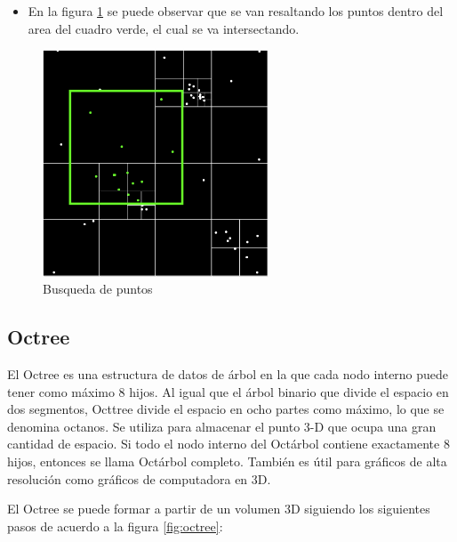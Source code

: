 \documentclass{article}
\begin{document}
\begin{itemize}
\item En la figura \ref{fig:quadtree_search} se puede observar que se van resaltando los puntos dentro del area del cuadro verde, el cual se va intersectando.
\end{itemize}

\begin{figure}[h!]
\centering
\includegraphics[width=0.6\textwidth]{img/quadtree_search.png}
\caption{Busqueda de puntos}
\label{fig:quadtree_search}
\end{figure}
\clearpage
\subsection{Octree}

 El Octree es una estructura de datos de árbol en la que cada nodo interno puede tener como máximo 8 hijos. Al igual que el árbol binario que divide el espacio en dos segmentos, Octtree divide el espacio en ocho partes como máximo, lo que se denomina octanos. Se utiliza para almacenar el punto 3-D que ocupa una gran cantidad de espacio. Si todo el nodo interno del Octárbol contiene exactamente 8 hijos, entonces se llama Octárbol completo. También es útil para gráficos de alta resolución como gráficos de computadora en 3D.
           
El Octree se puede formar a partir de un volumen 3D siguiendo los siguientes pasos de acuerdo a la figura \ref{fig:octree}:
           
\end{document}
